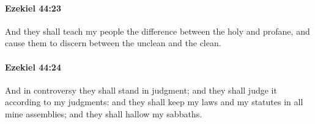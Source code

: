 		\paragraph{Ezekiel 44:23} %
			\label{EZEKIEL-44-23}

			And they shall teach my people the difference between the holy and profane, and cause them to discern between the unclean and the clean.


		\paragraph{Ezekiel 44:24} %
			\label{EZEKIEL-44-24}

			And in controversy they shall stand in judgment; and they shall judge it according to my judgments: and they shall keep my laws and my statutes in all mine assemblies; and they shall hallow my sabbaths.


